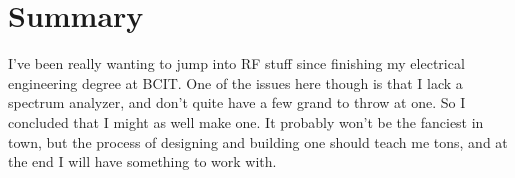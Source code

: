 \section{Summary}

I've been really wanting to jump into RF stuff since finishing my electrical
engineering degree at BCIT. One of the issues here though is that I lack a
spectrum analyzer, and don't quite have a few grand to throw at one. So I
concluded that I might as well make one.  It probably won't be the fanciest in
town, but the process of designing and building one should teach me tons, and at
the end I will have something to work with.
